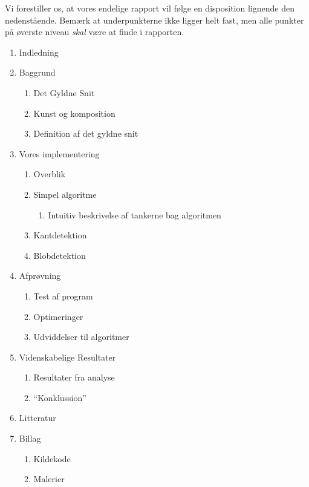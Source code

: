 Vi forestiller os, at vores endelige rapport vil følge en disposition lignende
den nedenstående. Bemærk at underpunkterne ikke ligger helt fast, men alle
punkter på øverste niveau \emph{skal} være at finde i rapporten.

\begin{enumerate}
	\item Indledning
	\item Baggrund
		\begin{enumerate}
			\item Det Gyldne Snit
			\item Kunst og komposition
			\item Definition af det gyldne snit
		\end{enumerate}
	\item Vores implementering
		\begin{enumerate}
			\item Overblik
			\item Simpel algoritme
				\begin{enumerate}
					\item Intuitiv beskrivelse af tankerne bag algoritmen
				\end{enumerate}
			\item Kantdetektion
			\item Blobdetektion
		\end{enumerate}
	\item Afprøvning
		\begin{enumerate}
			\item Test af program
			\item Optimeringer
			\item Udviddelser til algoritmer
		\end{enumerate}
	\item Videnskabelige Resultater
		\begin{enumerate}
			\item Resultater fra analyse
			\item ``Konklussion''
		\end{enumerate}
	\item Litteratur
	\item Billag
		\begin{enumerate}
			\item Kildekode
			\item Malerier
		\end{enumerate}
\end{enumerate}
